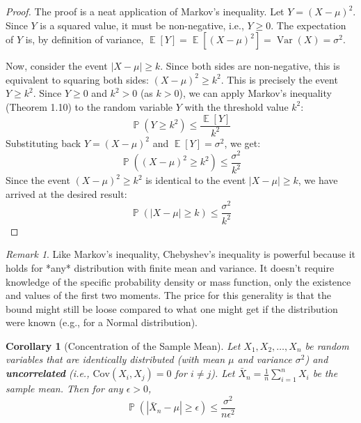 \documentclass[11pt]{article}
\newtheorem{corollary}[theorem]{Corollary}
\theoremstyle{definition}
\theoremstyle{remark}
\newtheorem{remark}[theorem]{Remark}
\DeclareMathOperator{\E}{\mathbb{E}} %
\DeclareMathOperator{\Var}{\text{Var}} %
\DeclareMathOperator{\Prob}{\mathbb{P}} %
\begin{document}
\begin{proof}
The proof is a neat application of Markov's inequality.
Let $Y = (X - \mu)^2$. Since $Y$ is a squared value, it must be non-negative, i.e., $Y \ge 0$.
The expectation of $Y$ is, by definition of variance, $\E[Y] = \E[(X - \mu)^2] = \Var(X) = \sigma^2$.

Now, consider the event $|X - \mu| \ge k$. Since both sides are non-negative, this is equivalent to squaring both sides: $(X - \mu)^2 \ge k^2$. This is precisely the event $Y \ge k^2$.
Since $Y \ge 0$ and $k^2 > 0$ (as $k>0$), we can apply Markov's inequality (Theorem 1.10) to the random variable $Y$ with the threshold value $k^2$:
\[
\Prob(Y \ge k^2) \le \frac{\E[Y]}{k^2}
\]
Substituting back $Y = (X-\mu)^2$ and $\E[Y] = \sigma^2$, we get:
\[
\Prob((X - \mu)^2 \ge k^2) \le \frac{\sigma^2}{k^2}
\]
Since the event $(X - \mu)^2 \ge k^2$ is identical to the event $|X - \mu| \ge k$, we have arrived at the desired result:
\[
\Prob(|X - \mu| \ge k) \le \frac{\sigma^2}{k^2}
\]
\end{proof}

\begin{remark}
Like Markov's inequality, Chebyshev's inequality is powerful because it holds for *any* distribution with finite mean and variance. It doesn't require knowledge of the specific probability density or mass function, only the existence and values of the first two moments. The price for this generality is that the bound might still be loose compared to what one might get if the distribution were known (e.g., for a Normal distribution).
\end{remark}

\begin{corollary}[Concentration of the Sample Mean]
Let $X_1, X_2, \dots, X_n$ be random variables that are identically distributed (with mean $\mu$ and variance $\sigma^2$) and \textbf{uncorrelated} (i.e., $\text{Cov}(X_i, X_j)=0$ for $i \ne j$). Let $\bar{X}_n = \frac{1}{n} \sum_{i=1}^n X_i$ be the sample mean. Then for any $\epsilon > 0$,
\[
\Prob(|\bar{X}_n - \mu| \ge \epsilon) \le \frac{\sigma^2}{n\epsilon^2}
\]
\end{corollary}
\end{document}
